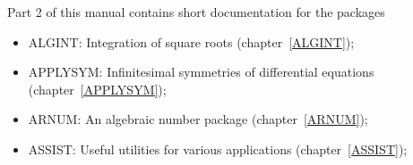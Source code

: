 Part 2 of this manual contains short documentation for the packages
\begin{itemize}
\item
{ALGINT: Integration of square roots} (chapter~\ref{ALGINT});

\item
{APPLYSYM: Infinitesimal symmetries of differential equations}
(chapter~\ref{APPLYSYM});

\item
{ARNUM: An algebraic number package} (chapter~\ref{ARNUM});

\item
{ASSIST: Useful utilities for various applications}
(chapter~\ref{ASSIST});


\end{itemize}
